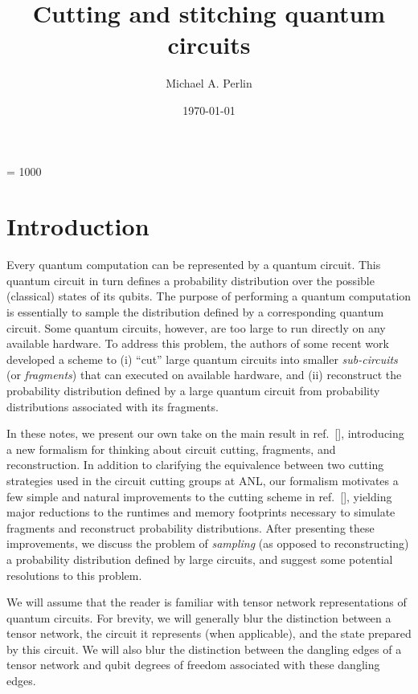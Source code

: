 \documentclass[nofootinbib,notitlepage,11pt]{revtex4-2}
\begin{document}
\count\footins = 1000 %

\title{Cutting and stitching quantum circuits}
\author{Michael A. Perlin}
\date{\today}

\maketitle
\thispagestyle{fancy}

\tableofcontents


\section{Introduction}
\label{sec:intro}

Every quantum computation can be represented by a quantum circuit.
This quantum circuit in turn defines a probability distribution over
the possible (classical) states of its qubits.  The purpose of
performing a quantum computation is essentially to sample the
distribution defined by a corresponding quantum circuit.  Some quantum
circuits, however, are too large to run directly on any available
hardware.  To address this problem, the authors of some recent
work\cite{peng2019simulating} developed a scheme to (i) ``cut'' large
quantum circuits into smaller {\it sub-circuits} (or {\it fragments})
that can executed on available hardware, and (ii) reconstruct the
probability distribution defined by a large quantum circuit from
probability distributions associated with its fragments.

In these notes, we present our own take on the main result in
ref.~[], introducing a new formalism for
thinking about circuit cutting, fragments, and reconstruction.  In
addition to clarifying the equivalence between two cutting strategies
used in the circuit cutting groups at ANL, our formalism motivates a
few simple and natural improvements to the cutting scheme in
ref.~[], yielding major reductions to the
runtimes and memory footprints necessary to simulate fragments and
reconstruct probability distributions.  After presenting these
improvements, we discuss the problem of {\it sampling} (as opposed to
reconstructing) a probability distribution defined by large circuits,
and suggest some potential resolutions to this problem.

We will assume that the reader is familiar with tensor network
representations of quantum circuits.  For brevity, we will generally
blur the distinction between a tensor network, the circuit it
represents (when applicable), and the state prepared by this circuit.
We will also blur the distinction between the dangling edges of a
tensor network and qubit degrees of freedom associated with these
dangling edges.
\end{document}
